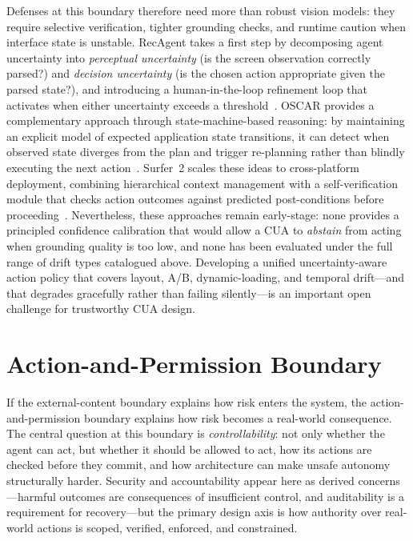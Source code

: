 Defenses at this boundary therefore need more than robust vision models: they require selective verification, tighter grounding checks, and runtime caution when interface state is unstable. RecAgent takes a first step by decomposing agent uncertainty into \emph{perceptual uncertainty} (is the screen observation correctly parsed?) and \emph{decision uncertainty} (is the chosen action appropriate given the parsed state?), and introducing a human-in-the-loop refinement loop that activates when either uncertainty exceeds a threshold~\cite{recagent2025}. OSCAR provides a complementary approach through state-machine-based reasoning: by maintaining an explicit model of expected application state transitions, it can detect when observed state diverges from the plan and trigger re-planning rather than blindly executing the next action~\cite{oscar2025}. Surfer~2 scales these ideas to cross-platform deployment, combining hierarchical context management with a self-verification module that checks action outcomes against predicted post-conditions before proceeding~\cite{surfer22025}. Nevertheless, these approaches remain early-stage: none provides a principled confidence calibration that would allow a CUA to \emph{abstain} from acting when grounding quality is too low, and none has been evaluated under the full range of drift types catalogued above. Developing a unified uncertainty-aware action policy that covers layout, A/B, dynamic-loading, and temporal drift---and that degrades gracefully rather than failing silently---is an important open challenge for trustworthy CUA design.

\section{Action-and-Permission Boundary}
\label{sec:action-permission}

If the external-content boundary explains how risk enters the system, the action-and-permission boundary explains how risk becomes a real-world consequence. The central question at this boundary is \emph{controllability}: not only whether the agent can act, but whether it should be allowed to act, how its actions are checked before they commit, and how architecture can make unsafe autonomy structurally harder. Security and accountability appear here as derived concerns---harmful outcomes are consequences of insufficient control, and auditability is a requirement for recovery---but the primary design axis is how authority over real-world actions is scoped, verified, enforced, and constrained.

